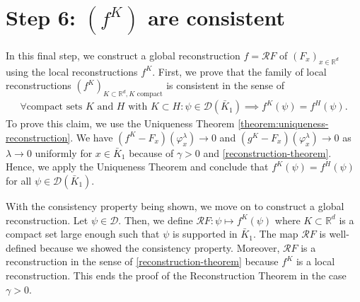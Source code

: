 \section{Step 6: \texorpdfstring{$(f^K)$ are consistent}{fK's are consistent}}

In this final step, we construct a global reconstruction $f = \mathcal{R}F$ of $(F_x)_{x \in \mathbb{R}^d}$  using the local reconstructions $f^K$. First, we prove that the family of local reconstructions $(f^K)_{K \subset \mathbb{R}^d, \text{$K$ compact}}$ is consistent in the sense of 
\begin{align*}
    \forall \text{compact sets $K$ and $H$ with } K \subset H: \psi \in \mathcal{D}(\bar K_1) \implies f^K(\psi) = f^H(\psi).
\end{align*}
To prove this claim, we use the Uniqueness Theorem \ref{theorem:uniqueness-reconstruction}. We have $(f^K - F_x)(\varphi^\lambda_x) \to 0$ and $(g^K - F_x)(\varphi^\lambda_x) \to 0$ as $\lambda \to 0$ uniformly for $x \in \bar K_1$ because of $\gamma > 0$ and \eqref{reconstruction-theorem}. Hence, we apply the Uniqueness Theorem and conclude that $f^K(\psi) = f^H(\psi)$ for all $\psi \in \mathcal{D}(\bar K_1)$.  

With the consistency property being shown, we move on to construct a global reconstruction. Let $\psi \in \mathcal{D}$. Then, we define $\mathcal{R}F: \psi \mapsto f^K(\psi)$ where $K \subset \mathbb{R}^d$ is a compact set large enough such that $\psi$ is supported in $\bar K_1$. The map $\mathcal{R}F$ is well-defined because we showed the consistency property. Moreover, $\mathcal{R}F$ is a reconstruction in the sense of \eqref{reconstruction-theorem} because $f^K$ is a local reconstruction. This ends the proof of the Reconstruction Theorem in the case $\gamma > 0$. 
